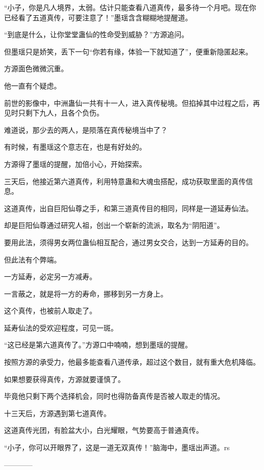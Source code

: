 \begin{this_body}
“小子，你是凡人境界，太弱。估计只能查看八道真传，最多待一个月吧。现在你已经看了五道真传，可要注意了！”墨瑶含含糊糊地提醒道。

“到底是什么，让你堂堂蛊仙的性命受到威胁？”方源追问。

但墨瑶只是娇笑，丢下一句“你若有缘，体验一下就知道了”，便重新隐匿起来。

方源面色微微沉重。

他一直有个疑虑。

前世的影像中，中洲蛊仙一共有十一人，进入真传秘境。但掐掉其中过程之后，再见时只剩下九人，且各个负伤。

难道说，那少去的两人，是陨落在真传秘境当中了？

有时候，有墨瑶这个意志在，也是有好处的。

方源得了墨瑶的提醒，加倍小心，开始探索。

三天后，他接近第六道真传，利用特意蛊和大魂虫搭配，成功获取里面的真传信息。

这道真传，出自巨阳仙尊之手，和第三道真传目的相同，同样是一道延寿仙法。

却是巨阳仙尊通过研究人祖，创出一个崭新的流派，取名为“阴阳道”。

要用此法，须得男女两位蛊仙相互配合，通过男女交合，达到一方延寿的目的。

但此法有个弊端。

一方延寿，必定另一方减寿。

一言蔽之，就是将一方的寿命，挪移到另一方身上。

这个真传，也被前人取走了。

延寿仙法的受欢迎程度，可见一斑。

“这已经是第六道真传了。”方源口中喃喃，想到墨瑶的提醒。

按照方源的承受力，他最多能查看八道传承，超过这个数目，就有重大危机降临。

如果想要获得真传，方源就要谨慎了。

毕竟他只剩下两个选择机会，同时也得防备真传是否被人取走的情况。

十三天后，方源遇到第七道真传。

这道真传光团，有脸盆大小，白光耀眼，气势要高于普通真传。

“小子，你可以开眼界了，这是一道无双真传！”脑海中，墨瑶出声道。rs

------------

\end{this_body}

